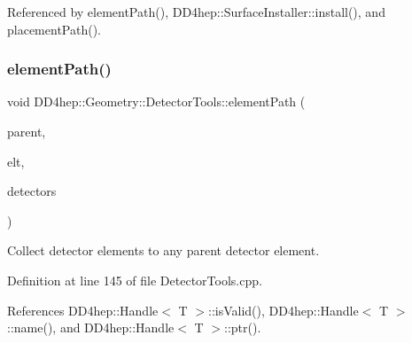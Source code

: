 Referenced by element\+Path(), D\+D4hep\+::\+Surface\+Installer\+::install(), and placement\+Path().

\hypertarget{namespace_d_d4hep_1_1_geometry_1_1_detector_tools_a33429898caa7f3ec3083fe50f04d01bc}{}\label{namespace_d_d4hep_1_1_geometry_1_1_detector_tools_a33429898caa7f3ec3083fe50f04d01bc} 
\subsubsection{\texorpdfstring{element\+Path()}{elementPath()}\hspace{0.1cm}{\footnotesize\ttfamily [2/7]}}
{\footnotesize\ttfamily void D\+D4hep\+::\+Geometry\+::\+Detector\+Tools\+::element\+Path (\begin{DoxyParamCaption}\item[{\hyperlink{class_d_d4hep_1_1_geometry_1_1_det_element}{Det\+Element}}]{parent,  }\item[{\hyperlink{class_d_d4hep_1_1_geometry_1_1_det_element}{Det\+Element}}]{elt,  }\item[{\hyperlink{namespace_d_d4hep_1_1_geometry_1_1_detector_tools_a57c8f37a975258fd84676a69e74c56ab}{Element\+Path} \&}]{detectors }\end{DoxyParamCaption})}



Collect detector elements to any parent detector element. 



Definition at line 145 of file Detector\+Tools.\+cpp.



References D\+D4hep\+::\+Handle$<$ T $>$\+::is\+Valid(), D\+D4hep\+::\+Handle$<$ T $>$\+::name(), and D\+D4hep\+::\+Handle$<$ T $>$\+::ptr().

\hypertarget{namespace_d_d4hep_1_1_geometry_1_1_detector_tools_a2788bc98d530b548cab41a422c67b48b}{}\label{namespace_d_d4hep_1_1_geometry_1_1_detector_tools_a2788bc98d530b548cab41a422c67b48b} 
